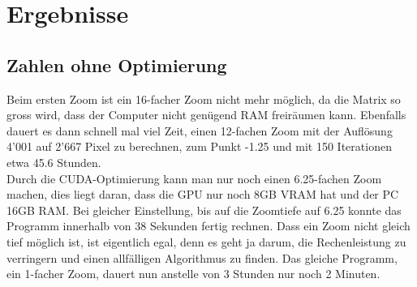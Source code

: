 \section{Ergebnisse}

\subsection{Zahlen ohne Optimierung}
Beim ersten Zoom ist ein 16-facher Zoom nicht mehr möglich, da die Matrix so gross wird, dass der Computer nicht genügend RAM freiräumen kann. Ebenfalls dauert es dann schnell mal viel Zeit, einen 12-fachen Zoom mit der Auflösung 4'001 auf 2'667 Pixel zu berechnen, zum Punkt -1.25 und mit 150 Iterationen etwa 45.6 Stunden.\\
Durch die CUDA-Optimierung kann man nur noch einen 6.25-fachen Zoom machen, dies liegt daran, dass die GPU nur noch 8GB VRAM hat und der PC 16GB RAM. Bei gleicher Einstellung, bis auf die Zoomtiefe auf 6.25 konnte das Programm innerhalb von 38 Sekunden fertig rechnen. Dass ein Zoom nicht gleich tief möglich ist, ist eigentlich egal, denn es geht ja darum, die Rechenleistung zu verringern und einen allfälligen Algorithmus zu finden. Das gleiche Programm, ein 1-facher Zoom, dauert nun anstelle von 3 Stunden nur noch 2 Minuten.
